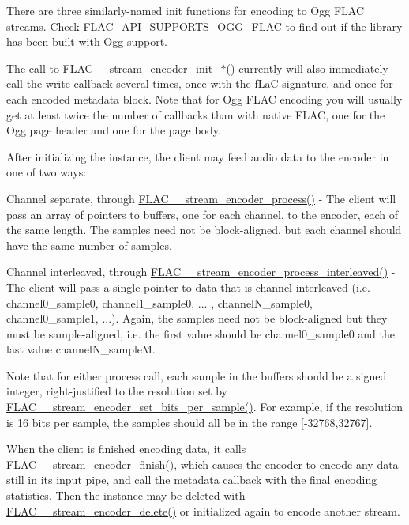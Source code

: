 There are three similarly-\/named init functions for encoding to Ogg F\+L\+AC streams. Check {\ttfamily F\+L\+A\+C\+\_\+\+A\+P\+I\+\_\+\+S\+U\+P\+P\+O\+R\+T\+S\+\_\+\+O\+G\+G\+\_\+\+F\+L\+AC} to find out if the library has been built with Ogg support.

The call to F\+L\+A\+C\+\_\+\+\_\+stream\+\_\+encoder\+\_\+init\+\_\+$\ast$() currently will also immediately call the write callback several times, once with the {\ttfamily f\+LaC} signature, and once for each encoded metadata block. Note that for Ogg F\+L\+AC encoding you will usually get at least twice the number of callbacks than with native F\+L\+AC, one for the Ogg page header and one for the page body.

After initializing the instance, the client may feed audio data to the encoder in one of two ways\+:


\begin{DoxyItemize}
\item Channel separate, through \mbox{\hyperlink{group__flac__stream__encoder_gae187ec4f6cab3ca109637996ee23272d}{F\+L\+A\+C\+\_\+\+\_\+stream\+\_\+encoder\+\_\+process()}} -\/ The client will pass an array of pointers to buffers, one for each channel, to the encoder, each of the same length. The samples need not be block-\/aligned, but each channel should have the same number of samples.
\item Channel interleaved, through \mbox{\hyperlink{group__flac__stream__encoder_ga67c2ff5b23b945180797de420b1f27c0}{F\+L\+A\+C\+\_\+\+\_\+stream\+\_\+encoder\+\_\+process\+\_\+interleaved()}} -\/ The client will pass a single pointer to data that is channel-\/interleaved (i.\+e. channel0\+\_\+sample0, channel1\+\_\+sample0, ... , channel\+N\+\_\+sample0, channel0\+\_\+sample1, ...). Again, the samples need not be block-\/aligned but they must be sample-\/aligned, i.\+e. the first value should be channel0\+\_\+sample0 and the last value channel\+N\+\_\+sampleM.
\end{DoxyItemize}

Note that for either process call, each sample in the buffers should be a signed integer, right-\/justified to the resolution set by \mbox{\hyperlink{group__flac__stream__encoder_ga5a21cf7f86a81df6ba72714a6b917aa3}{F\+L\+A\+C\+\_\+\+\_\+stream\+\_\+encoder\+\_\+set\+\_\+bits\+\_\+per\+\_\+sample()}}. For example, if the resolution is 16 bits per sample, the samples should all be in the range \mbox{[}-\/32768,32767\mbox{]}.

When the client is finished encoding data, it calls \mbox{\hyperlink{group__flac__stream__encoder_gab2c1e5477c1e3fe9ad0d722ff8eecda2}{F\+L\+A\+C\+\_\+\+\_\+stream\+\_\+encoder\+\_\+finish()}}, which causes the encoder to encode any data still in its input pipe, and call the metadata callback with the final encoding statistics. Then the instance may be deleted with \mbox{\hyperlink{group__flac__stream__encoder_ga9c9956af42bebe923da59437628aa9ea}{F\+L\+A\+C\+\_\+\+\_\+stream\+\_\+encoder\+\_\+delete()}} or initialized again to encode another stream.

